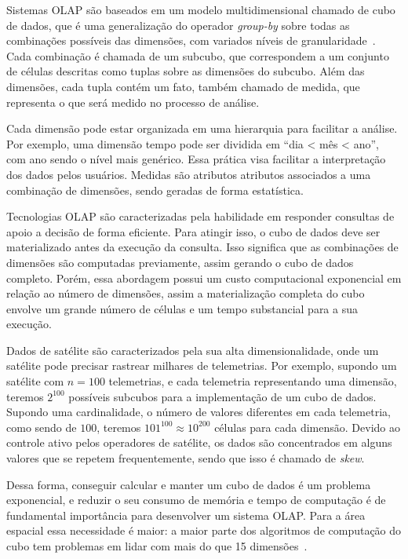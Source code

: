 Sistemas OLAP são baseados em um modelo multidimensional chamado de cubo de dados, que é uma generalização do operador \textit{group-by} sobre todas as combinações possíveis das dimensões, com variados níveis de granularidade~\cite{grayDataCubeRelational1996}.
Cada combinação é chamada de um subcubo, que correspondem a um conjunto de células descritas como tuplas sobre as dimensões do subcubo.
Além das dimensões, cada tupla contém um fato, também chamado de medida, que representa o que será medido no processo de análise.

Cada dimensão pode estar organizada em uma hierarquia para facilitar a análise.
Por exemplo, uma dimensão tempo pode ser dividida em ``dia < mês < ano'', com ano sendo o nível mais genérico.
Essa prática visa facilitar a interpretação dos dados pelos usuários.
Medidas são atributos atributos associados a uma combinação de dimensões, sendo geradas de forma estatística.

Tecnologias OLAP são caracterizadas pela habilidade em responder consultas de apoio a decisão de forma eficiente.
Para atingir isso, o cubo de dados deve ser materializado antes da execução da consulta.
Isso significa que as combinações de dimensões são computadas previamente, assim gerando o cubo de dados completo.
Porém, essa abordagem possui um custo computacional exponencial em relação ao número de dimensões, assim a materialização completa do cubo envolve um grande número de células e um tempo substancial para a sua execução.

Dados de satélite são caracterizados pela sua alta dimensionalidade, onde um satélite pode precisar rastrear milhares de telemetrias.
Por exemplo, supondo um satélite com $n = 100$ telemetrias, e cada telemetria representando uma dimensão, teremos $2^{100}$ possíveis subcubos para a implementação de um cubo de dados.
Supondo uma cardinalidade, o número de valores diferentes em cada telemetria, como sendo de $100$, teremos $101^{100} \approx 10^{200}$ células para cada dimensão.
{\color{cerulean}
Devido ao controle ativo pelos operadores de satélite, os dados são concentrados em alguns valores que se repetem frequentemente, sendo que isso é chamado de \textit{skew}.
}

Dessa forma, conseguir calcular e manter um cubo de dados é um problema exponencial, e reduzir o seu consumo de memória e tempo de computação é de fundamental importância para desenvolver um sistema OLAP.
Para a área espacial essa necessidade é maior: a maior parte dos algoritmos de computação do cubo tem problemas em lidar com mais do que 15 dimensões~\cite{silva:2015:abordagensParaCubo}.

